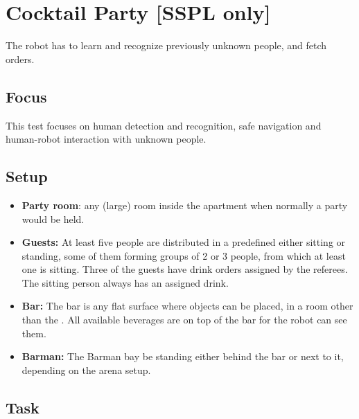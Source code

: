 \section{Cocktail Party [SSPL only]}

The robot has to learn and recognize previously unknown people, and fetch orders.

\subsection{Focus}

This test focuses on human detection and recognition, safe navigation and human-robot interaction with unknown people.

\subsection{Setup}
\begin{itemize}
	\item \textbf{Party room}: any (large) room inside the apartment when normally a party would be held.
	\item \textbf{Guests:} At least five people are distributed in a predefined  either sitting or standing, some of them forming groups of 2 or 3 people, from which at least one is sitting. Three of the guests have drink orders assigned by the referees. The sitting person always has an assigned drink.
	\item \textbf{Bar:} The bar is any flat surface where objects can be placed, in a room other than the . All available beverages are on top of the bar for the robot can see them.
	\item \textbf{Barman:} The Barman bay be standing either behind the bar or next to it, depending on the arena setup.
\end{itemize}

\subsection{Task}

